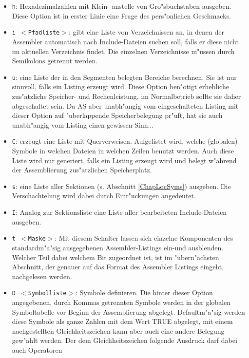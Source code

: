 \documentclass[12pt,a4paper,twoside]{report}
\newcommand{\tty}[1]{{\tt #1}}
\newcommand{\asname}{AS}
\begin{document}
\begin{itemize}
\item{\tty{h}: Hexadezimalzahlen mit Klein- anstelle von Gro"sbuchstaben ausgeben.
      Diese Option ist in erster Linie eine Frage des pers"onlichen
      Geschmacks.}
\item{\tty{i $<$Pfadliste$>$}: gibt eine Liste von Verzeichnissen an, in denen
      der Assembler automatisch nach Include-Dateien suchen soll, falls
      er diese nicht im aktuellen Verzeichnis findet. Die einzelnen
      Verzeichnisse m"ussen durch Semikolons getrennt werden.}
\item{\tty{u}: eine Liste der in den Segmenten belegten Bereiche berechnen.
      Sie ist nur sinnvoll, falls ein Listing erzeugt
      wird.  Diese Option ben"otigt erhebliche zus"atzliche Speicher-
      und Rechenleistung, im Normalbetrieb sollte sie daher abgeschaltet
      sein.  Da \asname{} aber unabh"angig vom eingeschalteten Listing mit dieser
      Option auf "uberlappende Speicherbelegung pr"uft, hat sie auch
      unabh"angig vom Listing einen gewissen Sinn...}
\item{\tty{C}: erzeugt eine Liste mit Querverweisen.  Aufgelistet wird,
      welche (globalen) Symbole in welchen Dateien in welchen Zeilen
      benutzt werden.  Auch diese Liste wird nur generiert, falls
      ein Listing erzeugt wird und belegt w"ahrend der
      Assemblierung zus"atzlichen Speicherplatz.}
\item{\tty{s}: eine Liste aller Sektionen (s. Abschnitt \ref{ChapLocSyms})
      ausgeben.  Die Verschachtelung wird dabei durch Einr"uckungen
      angedeutet.}
\item{\tty{I}: Analog zur Sektionsliste eine Liste aller bearbeiteten
      Include-Dateien ausgeben.}
\item{\tty{t $<$Maske$>$}: Mit diesem Schalter lassen sich einzelne Komponenten
      des standardm"a"sig ausgegebenen Assembler-Listings ein-und ausblenden.
      Welcher Teil dabei welchem Bit zugeordnet ist, ist im "ubern"achsten
      Abschnitt, der genauer auf das Format des Assembler Listings eingeht,
      nachgelesen werden.}
\item{\tty{D $<$Symbolliste$>$}: Symbole definieren. Die hinter dieser Option
      angegebenen, durch Kommas getrennten Symbole werden in der
      globalen Symboltabelle vor Beginn der Assemblierung abgelegt.
      Defaultm"a"sig werden diese Symbole als ganze Zahlen mit dem
      Wert TRUE abgelegt, mit einem nachgestellten Gleichheitszeichen
      kann aber auch eine andere Belegung gew"ahlt werden.  Der dem
      Gleichheitszeichen folgende Ausdruck darf dabei auch Operatoren
}
\end{itemize}
\end{document}
